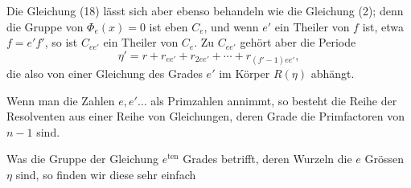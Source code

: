 Die Gleichung (18) lässt sich aber ebenso behandeln wie die Gleichung (2); denn die Gruppe von $\Phi_e(x) = 0$ ist eben $C_e$, und wenn $e'$ ein Theiler von $f$ ist, etwa $f = e'f'$, so ist $C_{ee'}$ ein Theiler von $C_e$. Zu $C_{ee'}$ gehört aber die Periode
\[
\eta' = r + r_{ee'} + r_{2ee'} + \cdots + r_{(f'-1)ee'},
\]
die also von einer Gleichung des Grades $e'$ im Körper $R(\eta)$ abhängt.

Wenn man die Zahlen $e, e' \ldots$ als Primzahlen annimmt, so besteht die Reihe der Resolventen aus einer Reihe von Gleichungen, deren Grade die Primfactoren von $n - 1$ sind.

Was die Gruppe der Gleichung $e^{\mathrm{ten}}$ Grades betrifft, deren Wurzeln die $e$ Grössen $\eta$ sind, so finden wir diese sehr einfach
